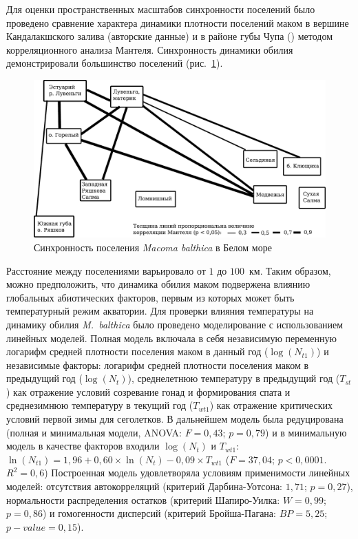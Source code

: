 {Для оценки пространственных масштабов синхронности поселений было проведено сравнение характера динамики плотности поселений маком в вершине Кандалакшского залива (авторские данные) и в районе губы Чупа (\cite{Maximovich_et_al_1991, Gerasimova_Maximovich_2013, Varfolomeeva_Naumov_2013}) методом корреляционного анализа Мантеля.
Синхронность динамики обилия демонстрировали большинство поселений (рис.~\ref{ris:mantel}).
	\begin{figure}[]
	\begin{center}	
		\includegraphics[width=\textwidth]{../White_Sea/dynamic_N_N1/mantel1.pdf}
	\end{center}
		\caption{Синхронность поселения \textit{Macoma balthica} в Белом море}
		\label{ris:mantel}
	\end{figure}
Расстояние между поселениями варьировало от $1$ до $100$~км.
Таким образом, можно предположить, что динамика обилия маком подвержена влиянию глобальных абиотических факторов, первым из которых может быть температурный режим акватории. 
Для проверки влияния температуры на динамику обилия \textit{M.~balthica} было проведено моделирование с использованием линейных моделей. 
Полная модель включала в себя независимую переменную логарифм средней плотности поселения маком в данный год ($\log(N_{t1})$) и независимые факторы: логарифм средней плотности поселения маком в предыдущий год ($\log(N_{t})$), среднелетнюю температуру в предыдущий год ($T_{st}$) как отражение условий созревание гонад и формирования спата и среднезимнюю температуру в текущий год ($T_{wt1}$) как отражение критических условий первой зимы для сеголетков. 
В дальнейшем модель была редуцирована (полная и минимальная модели, ANOVA: $F = 0,43$; $p = 0,79$) и в минимальную модель в качестве факторов входили $\log(N_{t})$ и $T_{wt1}$: $\ln(N_{t1}) = 1,96 + 0,60 \times \ln(N_{t}) - 0,09 \times T_{wt1}$ ($F = 37,04$; $p < 0,0001$. $R^2 = 0,6$)
Построенная модель удовлетворяла условиям применимости линейных моделей: отсутствия автокорреляций (критерий Дарбина-Уотсона: $1,71$; $p = 0,27$), нормальности распределения остатков (критерий Шапиро-Уилка: $W = 0,99$; $p = 0,86$) и гомогенности дисперсий (критерий Бройша-Пагана: $BP = 5,25$; $p-value = 0,15$). 

}
